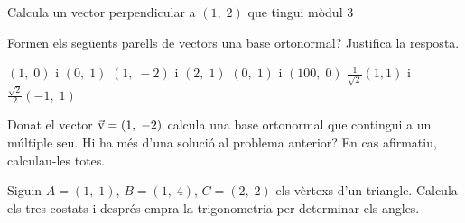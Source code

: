 \begin{activitats}
\begin{mylist}
		 \exer  Calcula un vector perpendicular a $\left(1,\; 2\right)$ que tingui mòdul 3 
		
		 
		
		\exer  Formen els següents parells de vectors una base ortonormal? Justifica la resposta.
		\begin{tasks}
			\task	$\left(1,\; 0\right)$ i $\left(0,\; 1\right)$  	
			\task $\left(1,\; -2\right)$ i $\left(2,\; 1\right)$  	
			\task $\left(0,\; 1\right)$ i $\left(100,\; 0\right)$ 	
			\task $\frac{1}{\sqrt{2} } \left(1,1\right)$ i $\frac{\sqrt{2} }{2} \left(-1,\; 1\right)$
		\end{tasks}
		
		
		\exer  Donat el vector $\vec{\mathrm{v}}=\left(1,\; -2\right)$ calcula una base ortonormal que contingui a un múltiple seu. Hi ha més d'una solució al problema anterior? En cas afirmatiu, calculau-les totes.
	  
	  
	 \exer  Siguin $A=\left(1,\; 1\right)$, $B=\left(1,\; 4\right)$, $C=\left(2,\; 2\right)$ els vèrtexs d'un triangle. Calcula els tres costats i després empra la trigonometria per determinar els angles.
	 
	 

\end{mylist}
\end{activitats}
